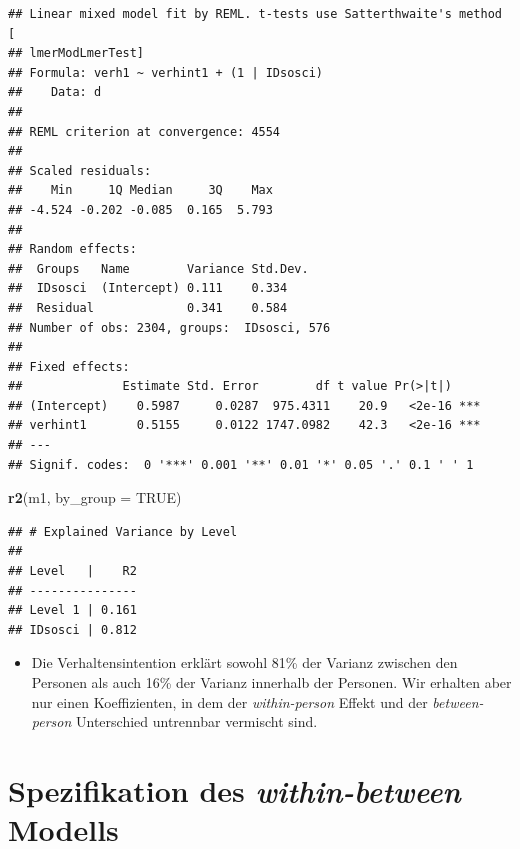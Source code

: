 \documentclass[
]{book}
\newenvironment{Shaded}{\begin{snugshade}}{\end{snugshade}}
\newcommand{\DataTypeTok}[1]{\textcolor[rgb]{0.13,0.29,0.53}{#1}}
\newcommand{\KeywordTok}[1]{\textcolor[rgb]{0.13,0.29,0.53}{\textbf{#1}}}
\newcommand{\NormalTok}[1]{#1}
\newcommand{\OperatorTok}[1]{\textcolor[rgb]{0.81,0.36,0.00}{\textbf{#1}}}
\newcommand{\OtherTok}[1]{\textcolor[rgb]{0.56,0.35,0.01}{#1}}
\newcommand{\StringTok}[1]{\textcolor[rgb]{0.31,0.60,0.02}{#1}}
\providecommand{\tightlist}{%
  \setlength{\itemsep}{0pt}\setlength{\parskip}{0pt}}
\begin{document}
\begin{Shaded}
\end{Shaded}

\begin{verbatim}
## Linear mixed model fit by REML. t-tests use Satterthwaite's method [
## lmerModLmerTest]
## Formula: verh1 ~ verhint1 + (1 | IDsosci)
##    Data: d
## 
## REML criterion at convergence: 4554
## 
## Scaled residuals: 
##    Min     1Q Median     3Q    Max 
## -4.524 -0.202 -0.085  0.165  5.793 
## 
## Random effects:
##  Groups   Name        Variance Std.Dev.
##  IDsosci  (Intercept) 0.111    0.334   
##  Residual             0.341    0.584   
## Number of obs: 2304, groups:  IDsosci, 576
## 
## Fixed effects:
##              Estimate Std. Error        df t value Pr(>|t|)    
## (Intercept)    0.5987     0.0287  975.4311    20.9   <2e-16 ***
## verhint1       0.5155     0.0122 1747.0982    42.3   <2e-16 ***
## ---
## Signif. codes:  0 '***' 0.001 '**' 0.01 '*' 0.05 '.' 0.1 ' ' 1
\end{verbatim}

\begin{Shaded}
\begin{Highlighting}[]
\KeywordTok{r2}\NormalTok{(m1, }\DataTypeTok{by_group =} \OtherTok{TRUE}\NormalTok{)}
\end{Highlighting}
\end{Shaded}

\begin{verbatim}
## # Explained Variance by Level
## 
## Level   |    R2
## ---------------
## Level 1 | 0.161
## IDsosci | 0.812
\end{verbatim}

\begin{itemize}
\tightlist
\item
  Die Verhaltensintention erklärt sowohl 81\% der Varianz zwischen den Personen als auch 16\% der Varianz innerhalb der Personen. Wir erhalten aber nur einen Koeffizienten, in dem der \emph{within-person} Effekt und der \emph{between-person} Unterschied untrennbar vermischt sind.
\end{itemize}

\hypertarget{spezifikation-des-within-between-modells}{%
\section{\texorpdfstring{Spezifikation des \emph{within-between} Modells}{Spezifikation des within-between Modells}}\label{spezifikation-des-within-between-modells}}
\end{document}
